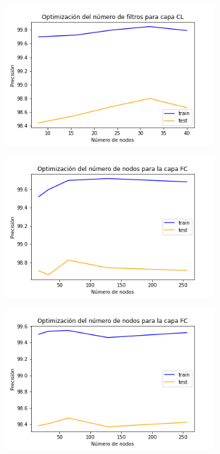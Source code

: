 \documentclass[11pt]{article}
\begin{document}
\begin{figure}[H]
\begin{subfigure}[c]{0.4\textwidth}
        \caption{}
        \label{fig:DropOut}
    \end{subfigure}
    \begin{subfigure}[c]{0.4\textwidth}
        \includegraphics[width=\textwidth]{ConvolutinoNodes.png}
        \caption{}
        \label{fig:ConvNodes}
    \end{subfigure}
    \begin{subfigure}[c]{0.4\textwidth}
        \includegraphics[width=\textwidth]{FullConnectedNodes-2CL.png}
        \caption{}
        \label{fig:FullConn2CL}
    \end{subfigure}
    \begin{subfigure}[c]{0.4\textwidth}
        \includegraphics[width=\textwidth]{FullConnectedNodes-3CL.png}

\end{subfigure}
\end{figure}
\end{document}
